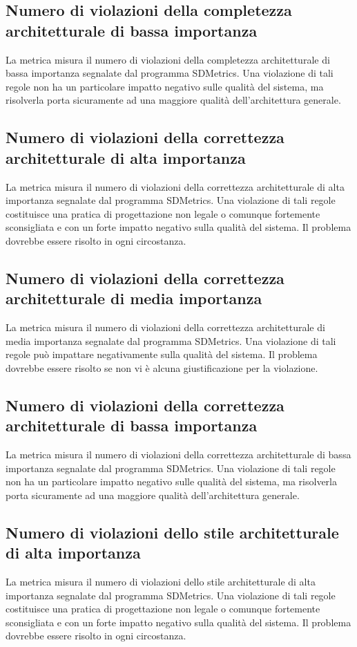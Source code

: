 \subsection{Numero di violazioni della completezza architetturale di bassa importanza}
La metrica misura il numero di violazioni della completezza architetturale di bassa importanza segnalate dal programma SDMetrics. Una violazione di tali regole non ha un particolare impatto negativo sulle qualità del sistema, ma risolverla porta sicuramente ad una maggiore qualità dell'architettura generale.


\subsection{Numero di violazioni della correttezza architetturale di alta importanza}
La metrica misura il numero di violazioni della correttezza architetturale di alta importanza segnalate dal programma SDMetrics. Una violazione di tali regole costituisce una pratica di progettazione non legale o comunque fortemente sconsigliata e con un forte impatto negativo sulla qualità del sistema. Il problema dovrebbe essere risolto in ogni circostanza.


\subsection{Numero di violazioni della correttezza architetturale di media importanza}
La metrica misura il numero di violazioni della correttezza architetturale di media importanza segnalate dal programma SDMetrics. Una violazione di tali regole può impattare negativamente sulla qualità del sistema. Il problema dovrebbe essere risolto se non vi è alcuna giustificazione per la violazione.


\subsection{Numero di violazioni della correttezza architetturale di bassa importanza}
La metrica misura il numero di violazioni della correttezza architetturale di bassa importanza segnalate dal programma SDMetrics. Una violazione di tali regole non ha un particolare impatto negativo sulle qualità del sistema, ma risolverla porta sicuramente ad una maggiore qualità dell'architettura generale.


\subsection{Numero di violazioni dello stile architetturale di alta importanza}
La metrica misura il numero di violazioni dello stile architetturale di alta importanza segnalate dal programma SDMetrics. Una violazione di tali regole costituisce una pratica di progettazione non legale o comunque fortemente sconsigliata e con un forte impatto negativo sulla qualità del sistema. Il problema dovrebbe essere risolto in ogni circostanza.


